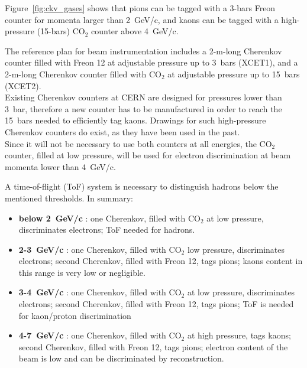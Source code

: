  Figure~\ref{fig:ckv_gases} shows that pions can be tagged with a 3-bars Freon counter for momenta larger than 2~GeV/c, and kaons can be tagged with a high-pressure  (15-bars) CO$_2$  counter above 4~GeV/c.

The reference plan for beam instrumentation includes a 2-m-long
Cherenkov  counter filled with Freon 12 at adjustable pressure up to
3~bars (XCET1), and a  2-m-long  
 Cherenkov  counter filled with CO$_2$ at adjustable pressure up to
 15~bars (XCET2).\\
Existing Cherenkov counters at CERN are designed for pressures lower than  3~bar, therefore a new counter has to be manufactured in order to reach the 15~bars needed to efficiently tag kaons. Drawings for such high-pressure Cherenkov counters do exist, as they have been %
used in the past. \\
%
Since it will not be necessary to use both counters at all energies, the CO$_2$
counter, filled at low pressure,  will be used for electron discrimination at beam momenta lower
than 4~GeV/c.  

A time-of-flight (ToF) system  is  necessary   to distinguish hadrons below the mentioned thresholds.
%
In summary:
\begin{itemize}
\item {\bf below 2~GeV/c} : one Cherenkov, filled with CO$_2$ at low
  pressure, discriminates electrons; ToF needed for hadrons.
\item {\bf 2-3~GeV/c} : one Cherenkov, filled with CO$_2$ low
  pressure, discriminates electrons; second Cherenkov, filled with
  Freon 12, tags pions; kaons content in this range is very low or negligible.
\item {\bf 3-4~GeV/c} : one Cherenkov, filled with CO$_2$ at low
  pressure, discriminates electrons; second  Cherenkov, filled with
  Freon 12, tags pions; ToF is needed for kaon/proton discrimination
\item {\bf 4-7~GeV/c} : one Cherenkov, filled with CO$_2$ at high
  pressure, tags kaons; second  Cherenkov, filled with
  Freon 12, tags pions; electron content of the beam is low and can be
  discriminated by reconstruction.
\end{itemize}

